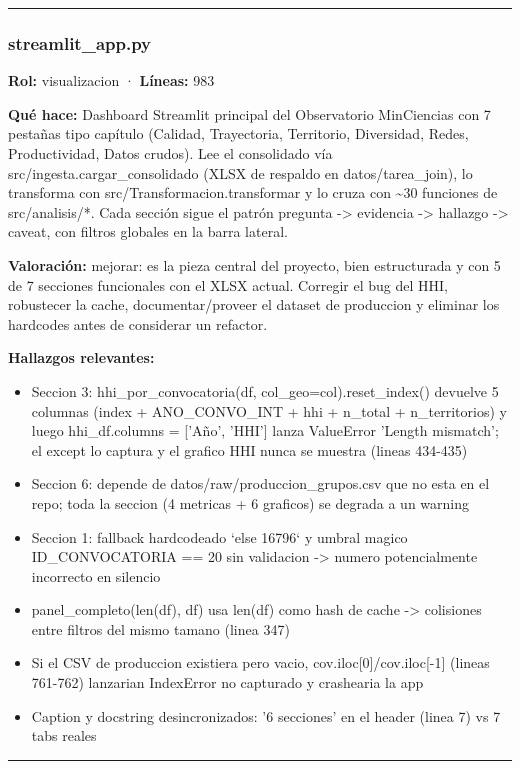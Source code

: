 \medskip
\hrule

\subsubsection{streamlit\_app.py}
\textbf{Rol:} visualizacion · \textbf{Líneas:} 983

\textbf{Qué hace:} Dashboard Streamlit principal del Observatorio MinCiencias con 7 pestañas tipo capítulo (Calidad, Trayectoria, Territorio, Diversidad, Redes, Productividad, Datos crudos). Lee el consolidado vía src/ingesta.cargar\_consolidado (XLSX de respaldo en datos/tarea\_join), lo transforma con src/Transformacion.transformar y lo cruza con \textasciitilde{}30 funciones de src/analisis/*. Cada sección sigue el patrón pregunta -> evidencia -> hallazgo -> caveat, con filtros globales en la barra lateral.

\textbf{Valoración:} mejorar: es la pieza central del proyecto, bien estructurada y con 5 de 7 secciones funcionales con el XLSX actual. Corregir el bug del HHI, robustecer la cache, documentar/proveer el dataset de produccion y eliminar los hardcodes antes de considerar un refactor.

\textbf{Hallazgos relevantes:}
\begin{itemize}
  \item Seccion 3: hhi\_por\_convocatoria(df, col\_geo=col).reset\_index() devuelve 5 columnas (index + ANO\_CONVO\_INT + hhi + n\_total + n\_territorios) y luego hhi\_df.columns = ['Año', 'HHI'] lanza ValueError 'Length mismatch'; el except lo captura y el grafico HHI nunca se muestra (lineas 434-435)
  \item Seccion 6: depende de datos/raw/produccion\_grupos.csv que no esta en el repo; toda la seccion (4 metricas + 6 graficos) se degrada a un warning
  \item Seccion 1: fallback hardcodeado `else 16796` y umbral magico ID\_CONVOCATORIA == 20 sin validacion -> numero potencialmente incorrecto en silencio
  \item panel\_completo(len(df), df) usa len(df) como hash de cache -> colisiones entre filtros del mismo tamano (linea 347)
  \item Si el CSV de produccion existiera pero vacio, cov.iloc[0]/cov.iloc[-1] (lineas 761-762) lanzarian IndexError no capturado y crashearia la app
  \item Caption y docstring desincronizados: '6 secciones' en el header (linea 7) vs 7 tabs reales
\end{itemize}

\medskip
\hrule
